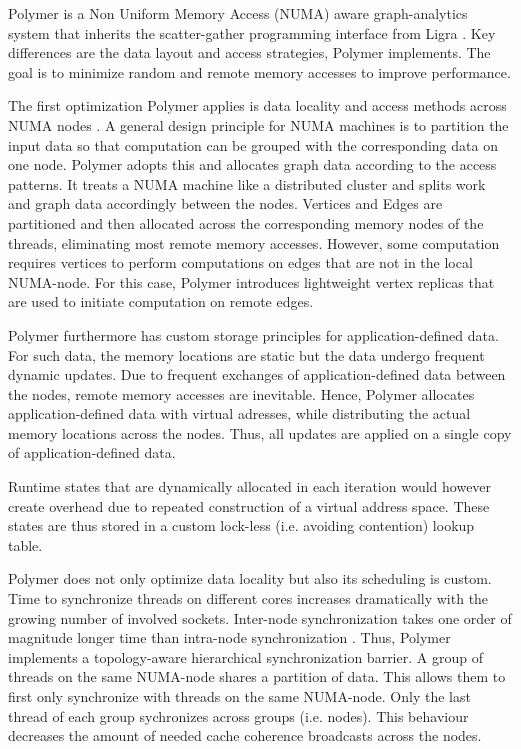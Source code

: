 
Polymer is a Non Uniform Memory Access (NUMA) aware graph-analytics system that inherits the scatter-gather programming interface from Ligra \cite{Ligra}.
Key differences are the data layout and access strategies, Polymer implements.
The goal is to minimize random and remote memory accesses to improve performance.

The first optimization Polymer applies is data locality and access methods across NUMA nodes \cite{Polymer}.
A general design principle for NUMA machines is to partition the input data so that computation can be grouped with the corresponding data on one node.
Polymer adopts this and allocates graph data according to the access patterns.
It treats a NUMA machine like a distributed cluster and splits work and graph data accordingly between the nodes.
Vertices and Edges are partitioned and then allocated across the corresponding memory nodes of the threads, eliminating most remote memory accesses.
However, some computation requires vertices to perform computations on edges that are not in the local NUMA-node.
For this case, Polymer introduces lightweight vertex replicas that are used to initiate computation on remote edges.

Polymer furthermore has custom storage principles for application-defined data.
For such data, the memory locations are static but the data undergo frequent dynamic updates. Due to frequent exchanges of application-defined data between the nodes, remote memory accesses are inevitable.
Hence, Polymer allocates application-defined data with virtual adresses, while distributing the actual memory locations across the nodes. Thus, all updates are applied on a single copy of application-defined data.

Runtime states that are dynamically allocated in each iteration would however create overhead due to repeated construction of a virtual address space.
These states are thus stored in a custom lock-less (i.e. avoiding contention) lookup table.

Polymer does not only optimize data locality but also its scheduling is custom.
Time to synchronize threads on different cores increases dramatically with the growing number of involved sockets. Inter-node synchronization takes one order of magnitude longer time than intra-node synchronization \cite{Polymer}.
Thus, Polymer implements a topology-aware hierarchical synchronization barrier.
A group of threads on the same NUMA-node shares a partition of data. This allows them to first only synchronize with threads on the same NUMA-node. Only the last thread of each group sychronizes across groups (i.e. nodes). This behaviour decreases the amount of needed cache coherence broadcasts across the nodes.

